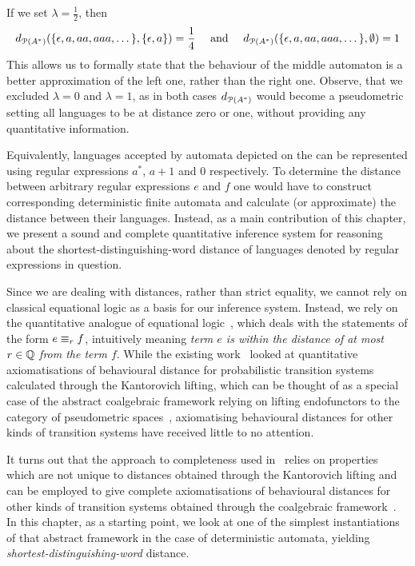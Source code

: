 If we set $\lambda = \frac{1}{2}$, then
\begin{gather*}
	d_{\mathcal{P}({A}^{\ast})}(\{\epsilon, a, aa, aaa, \dots\}, \{\epsilon, a\}) = \frac{1}{4} \quad \text{ and } \quad d_{\mathcal{P}({A}^{\ast})}(\{\epsilon,a,aa,aaa, \dots\}, \emptyset)=1
\end{gather*}
This allows us to formally state that the behaviour of the middle automaton is a better approximation of the left one, rather than the right one. Observe, that we excluded $\lambda=0$ and $\lambda=1$, as in both cases $d_{\mathcal{P}({A}^{\ast})}$ would become a pseudometric setting all languages to be at distance zero or one, without providing any quantitative information. 


Equivalently, languages accepted by automata depicted on the  can be represented using regular expressions $a^*$, $a + 1$ and $0$ respectively.  To determine the distance between arbitrary regular expressions $e$ and $f$ one would have to construct corresponding deterministic finite automata and calculate (or approximate) the distance between their languages. Instead, as a main contribution of this chapter, we present a sound and complete quantitative inference system for reasoning about the shortest-distinguishing-word distance of languages denoted by regular expressions in question.

Since we are dealing with distances, rather than strict equality, we cannot rely on classical equational logic as a basis for our inference system. Instead, we rely on the quantitative analogue of equational logic~\cite{Mardare:2016:Quantitative}, which deals with the statements of the form $e \equiv_{r} f$, intuitively meaning \emph{term $e$ is within the distance of at most $r \in \mathbb{Q}$ from the term $f$}. While the existing work~\cite{Bacci:2018:Algebraic,Bacci:2018:Bisimilarity,Bacci:2018:TV} looked at quantitative axiomatisations of behavioural distance for probabilistic transition systems calculated through the Kantorovich lifting, which can be thought of as a special case of the abstract coalgebraic framework relying on lifting endofunctors to the category of pseudometric spaces~\cite{Baldan:2018:Coalgebraic}, axiomatising behavioural distances for other kinds of transition systems have received little to no attention.

It turns out that the approach to completeness used in~\cite{Bacci:2018:Bisimilarity} relies on properties which are not unique to distances obtained through the Kantorovich lifting and can be employed to give complete axiomatisations of behavioural distances for other kinds of transition systems obtained through the coalgebraic framework~\cite{Baldan:2018:Coalgebraic}. In this chapter, as a starting point, we look at one of the simplest instantiations of that abstract framework in the case of deterministic automata, yielding \emph{shortest-distinguishing-word} distance. 

